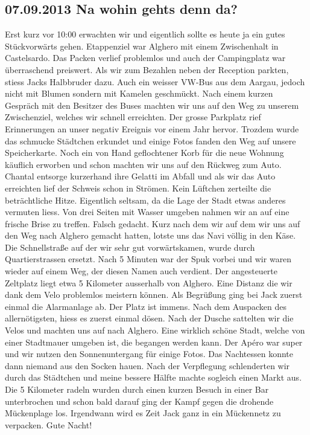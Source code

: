 \subsection{07.09.2013 Na wohin gehts denn da?} 
Erst kurz vor 10:00 erwachten wir und eigentlich sollte es heute ja ein gutes Stückvorwärts gehen.
Etappenziel war Alghero mit einem Zwischenhalt in Castelsardo.
Das Packen verlief problemlos und auch der Campingplatz war überraschend preiswert.
Als wir zum Bezahlen neben der Reception parkten, stiess Jacks Halbbruder dazu.
Auch ein weisser VW-Bus aus dem Aargau, jedoch nicht mit Blumen sondern mit Kamelen geschmückt.
Nach einem kurzen Gespräch mit den Besitzer des Buses machten wir uns auf den Weg zu unserem Zwischenziel, welches wir schnell erreichten.
Der grosse Parkplatz rief Erinnerungen an unser negativ Ereignis vor einem Jahr hervor.
Trozdem wurde das schmucke Städtchen erkundet und einige Fotos fanden den Weg auf unsere Speicherkarte.
Noch ein von Hand geflochtener Korb für die neue Wohnung käuflich erworben und schon machten wir uns auf den Rückweg zum Auto.
Chantal entsorge kurzerhand ihre Gelatti im Abfall und als wir das Auto erreichten lief der Schweis schon in Strömen.
Kein Lüftchen zerteilte die beträchtliche Hitze.
Eigentlich seltsam, da die Lage der Stadt etwas anderes vermuten liess.
Von drei Seiten mit Wasser umgeben nahmen wir an auf eine frische Brise zu treffen.
Falsch gedacht.
Kurz nach dem wir auf dem wir uns auf den Weg nach Alghero gemacht hatten, lotste uns das Navi völlig in den Käse.
Die Schnellstraße auf der wir sehr gut vorwärtskamen, wurde durch Quartierstrassen ersetzt.
Nach 5 Minuten war der Spuk vorbei und wir waren wieder auf einem Weg, der diesen Namen auch verdient.
Der angesteuerte Zeltplatz liegt etwa 5 Kilometer ausserhalb von Alghero.
Eine Distanz die wir dank dem Velo problemlos meistern können.
Als Begrüßung ging bei Jack zuerst einmal die Alarmanlage ab.
Der Platz ist immens.
Nach dem Auspacken des allernötigsten, hiess es zuerst einmal dösen.
Nach der Dusche sattelten wir die Velos und machten uns auf nach Alghero.
Eine wirklich schöne Stadt, welche von einer Stadtmauer umgeben ist, die begangen werden kann.
Der Apéro war super und wir nutzen den Sonnenuntergang für einige Fotos.
Das Nachtessen konnte dann niemand aus den Socken hauen.
Nach der Verpflegung schlenderten wir durch das Städtchen und meine bessere Hälfte machte sogleich einen Markt aus.
Die 5 Kilometer radeln wurden durch einen kurzen Besuch in einer Bar unterbrochen und schon bald darauf ging der Kampf gegen die drohende Mückenplage los.
Irgendwann wird es Zeit Jack ganz in ein Mückennetz zu verpacken. Gute Nacht!

